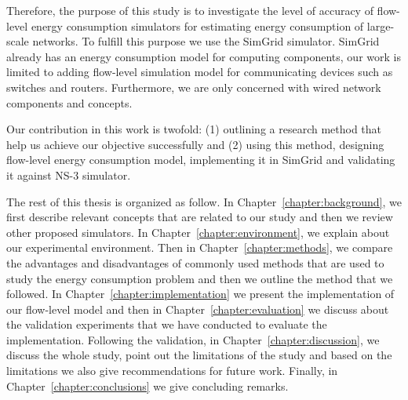 Therefore, the purpose of this study is to investigate the level of accuracy of flow-level energy consumption simulators for estimating energy consumption of large-scale networks. To fulfill this purpose we use the SimGrid simulator. SimGrid already has an energy consumption model for computing components, our work is limited to adding flow-level simulation model for communicating devices such as switches and routers. Furthermore, we are only concerned with wired network components and concepts. 

Our contribution in this work is twofold: (1) outlining a research method that help us achieve our objective successfully and (2) using this method, designing flow-level energy consumption model, implementing it in SimGrid and validating it against NS-3 simulator. 

The rest of this thesis is organized as follow. In Chapter~\ref{chapter:background}, we first describe relevant concepts that are related to our study and then we review other proposed simulators. In Chapter~\ref{chapter:environment}, we explain about our experimental environment. Then in Chapter~\ref{chapter:methods}, we compare the advantages and disadvantages of commonly used methods that are used to study the energy consumption problem and then we outline the method that we followed. In Chapter~\ref{chapter:implementation} we present the implementation of our flow-level model and then in Chapter~\ref{chapter:evaluation} we discuss about the validation experiments that we have conducted to evaluate the implementation. Following the validation, in Chapter~\ref{chapter:discussion}, we discuss the whole study, point out the limitations of the study and based on the limitations we also give recommendations for future work. Finally, in Chapter~\ref{chapter:conclusions} we give concluding remarks.


